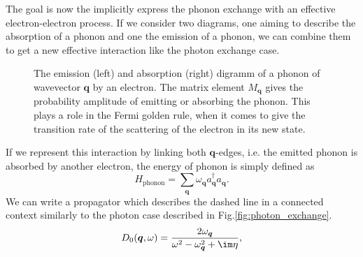 \documentclass[../main.tex]{subfile}
\begin{document}
The goal is now the implicitly express the phonon exchange with an effective electron-electron process. If we consider two diagrams, one aiming to describe the absorption of a phonon
and one the emission of a phonon, we can combine them to get a new effective interaction like the photon exchange case.
\begin{figure}[H]
    \centering
     \hspace{2cm}
    \caption{The emission (left) and absorption (right) digramm of a phonon of wavevector $\bm{q}$ by an electron.
    The matrix element $M_{\bm{q}}$ gives the probability amplitude of emitting or absorbing the phonon. This plays a role
    in the Fermi golden rule, when it comes to give the transition rate of the scattering of the electron in its new state.}
    \end{figure}
If we represent this interaction by linking both $\bm{q}$-edges, i.e. the emitted phonon is absorbed by another electron, the energy of phonon is simply defined as
\[
    H_{\text{phonon}} = \sum_{\bm{q}} \omega_{\bm{q}} a_{\bm{q}}^{\dagger}a_{\bm{q}}.
\]
We can write a propagator which describes the dashed line in a connected context similarly to the photon case described in Fig.\ref{fig:photon_exchange}.
\[
    D_0(\bm{q},\omega) = \frac{2\omega_{\bm{q}}}{\omega^2 - \omega_{\bm{q}}^2 + \im \eta},
\]
\end{document}
